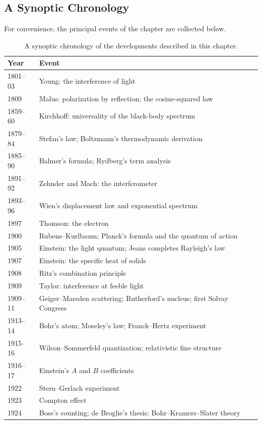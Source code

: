 \subsection*{A Synoptic Chronology}
For convenience, the principal events of the chapter are collected below.
\begin{table}[htbp!]
    \centering
    \caption{A synoptic chronology of the developments described in this chapter.}
    \begin{tabular}{ll}
        \toprule
        Year & Event \\
        \midrule
        1801--03 & Young: the interference of light \\
        1809 & Malus: polarization by reflection; the cosine-squared law \\
        1859--60 & Kirchhoff: universality of the black-body spectrum \\
        1879--84 & Stefan's law; Boltzmann's thermodynamic derivation \\
        1885--90 & Balmer's formula; Rydberg's term analysis \\
        1891--92 & Zehnder and Mach: the interferometer \\
        1893--96 & Wien's displacement law and exponential spectrum \\
        1897 & Thomson: the electron \\
        1900 & Rubens--Kurlbaum; Planck's formula and the quantum of action \\
        1905 & Einstein: the light quantum; Jeans completes Rayleigh's law \\
        1907 & Einstein: the specific heat of solids \\
        1908 & Ritz's combination principle \\
        1909 & Taylor: interference at feeble light \\
        1909--11 & Geiger--Marsden scattering; Rutherford's nucleus; first Solvay Congress \\
        1913--14 & Bohr's atom; Moseley's law; Franck--Hertz experiment \\
        1915--16 & Wilson--Sommerfeld quantization; relativistic fine structure \\
        1916--17 & Einstein's $A$ and $B$ coefficients \\
        1922 & Stern--Gerlach experiment \\
        1923 & Compton effect \\
        1924 & Bose's counting; de Broglie's thesis; Bohr--Kramers--Slater theory \\

\end{tabular}
\end{table}
